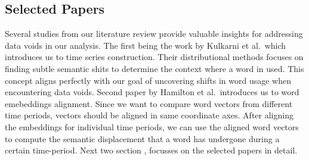 \subsection{Selected Papers}\label{subsec:selected-papers}
Several studies from our literature review provide valuable insights for addressing data voids in our analysis.
The first being the work by Kulkarni et al.\ which introduces us to time series construction.
Their distributional methods focuses on finding subtle semantic shits to determine the context where a word in used.
This concept aligns perfectly with our goal of uncovering shifts in word usage when encountering data voids.
Second paper by Hamilton et al.\ introduces us to word emebeddings alignment.
Since we want to compare word vectors from different time periods, vectors should be aligned in same coordinate axes.
After aligning the embeddings for individual time periods, we can use the aligned word vectors to compute the semantic displacement that a word has undergone during a certain time-period.
Next two section ,  focusses on the selected papers in detail.